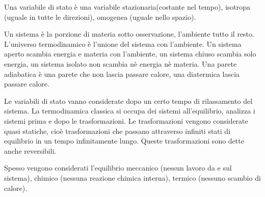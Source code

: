 Una variabile di stato è una variabile stazionaria(costante nel tempo), isotropa (uguale in tutte le direzioni), omogenea (uguale nello spazio).

Un sistema è la porzione di materia sotto osservazione, l'ambiente  tutto il resto. L'universo termodinamico è l'unione del sistema con l'ambiente. Un sistema aperto  scambia energia e materia con l'ambiente, un sistema chiuso  scambia solo energia, un sistema isolato non scambia nè energia nè materia. Una parete adiabatica è una parete che non lascia passare calore, una diatermica lascia passare calore.

Le variabili di stato vanno considerate dopo un certo tempo di rilassamento del sistema. La termodinamica classica si occupa dei sistemi all'equilibrio, analizza i sistemi prima e dopo le trasformazioni. Le trasformazioni vengono considerate quasi statiche, cioè trasformazioni che passano attraverso infiniti stati di equilibrio in un tempo infinitamente lungo. Queste trasformazioni sono dette anche reversibili.

Spesso vengono considerati l'equilibrio meccanico (nessun lavoro da e sul sistema), chimico (nessuna reazione chimica interna), termico (nessuno scambio di calore).

